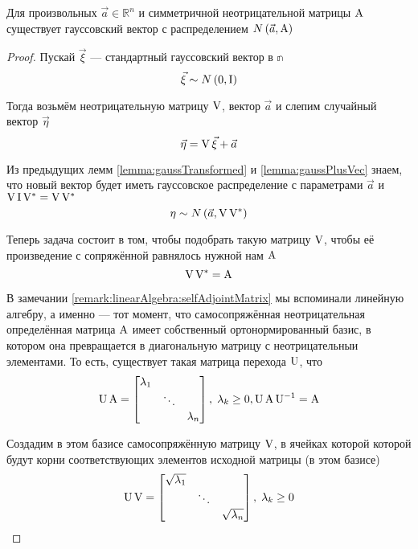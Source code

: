 \begin{theorem}
    Для произвольных $\vec{a} \in \mathbb{R}^n$ и симметричной неотрицательной
    матрицы $\mathrm{A}$ существует гауссовский вектор с распределением
    $N\left( \vec{a}, \mathrm{A} \right)$
\end{theorem}
\begin{proof}
    Пускай $\vec{\xi}$ --- стандартный гауссовский вектор в $\mathbb{n}$
    $$\vec{\xi} \sim N\left( 0, \mathrm{I} \right)$$

    Тогда возьмём неотрицательную матрицу $\mathrm{V}$, вектор $\vec{a}$ и
    слепим случайный вектор $\vec{\eta}$
    $$\vec{\eta} = \mathrm{V}\, {\vec{\xi}} + \vec{a}$$

    Из предыдущих лемм \ref{lemma:gaussTransformed} и \ref{lemma:gaussPlusVec}
    знаем, что новый вектор будет иметь гауссовское распределение с параметрами
    $\vec{a}$ и $\mathrm{V}\, {\mathrm{I}\, {\mathrm{V}^*}}
    = \mathrm{V}\, {\mathrm{V}^*}$
    $$\eta \sim N\left( \vec{a}, \mathrm{V}\, {\mathrm{V}^*} \right)$$

    Теперь задача состоит в том, чтобы подобрать такую матрицу $\mathrm{V}$,
    чтобы её произведение с сопряжённой равнялось нужной нам $\mathrm{A}$
    $$\mathrm{V}\, {\mathrm{V}^*} = \mathrm{A}$$

    В замечании \ref{remark:linearAlgebra:selfAdjointMatrix} мы вспоминали
    линейную алгебру, а именно --- тот момент, что самосопряжённая
    неотрицательная определённая матрица $\mathrm{A}$ имеет собственный
    ортонормированный базис, в котором она превращается в диагональную матрицу
    с неотрицательныи элементами. То есть, существует такая матрица перехода
    $\mathrm{U}$, что
    $$\mathrm{U}\, {\mathrm{A}} =
    \begin{bmatrix}
        \lambda_1 & & \\
        & \ddots &  \\
        & & \lambda_n
    \end{bmatrix},\;
        \lambda_k \ge 0,
        \mathrm{U}\, {\mathrm{A}\, {\mathrm{U}^{-1}}} = \mathrm{A}$$

    Создадим в этом базисе самосопряжённую матрицу $\mathrm{V}$, в ячейках
    которой которой будут корни соответствующих элементов исходной матрицы
    (в этом базисе)
    $$\mathrm{U}\, {\mathrm{V}} =
    \begin{bmatrix}
        \sqrt{\lambda_1} & & \\
        & \ddots &  \\
        & & \sqrt{\lambda_n}
    \end{bmatrix},\; \lambda_k \ge 0$$


\end{proof}
